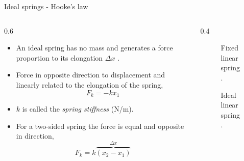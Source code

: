 \documentclass[11pt,aspectratio=169,handout]{beamer}
\begin{document}
\begin{frame}[c]{Ideal springs - Hooke's law}
	\begin{columns}[T]
		\begin{column}{0.6\textwidth}
			\begin{itemize}
				\item An ideal spring has no mass and generates a force proportion to its elongation $\Delta x$ .  
				\item Force in opposite direction to displacement and linearly related to the elongation of the spring,
				\begin{equation}
					F_k = -kx_1
				\end{equation}
				\item $k$ is called the \textit{spring stiffness} (N/m).
				\item For a two-sided spring the force is equal and opposite in direction,
				\begin{equation}
					F_k = k\overbrace{(x_2-x_1)}^{\Delta x}
				\end{equation}
			\end{itemize}
		\end{column}
		\begin{column}{0.4\textwidth}
			\begin{figure}
				\centering
				
				\caption{Fixed linear spring.}
			\end{figure}
			\begin{figure}
				\centering
				
				\caption{Ideal linear spring.}
			\end{figure}
		\end{column}
	\end{columns}
\end{frame}
\end{document}
